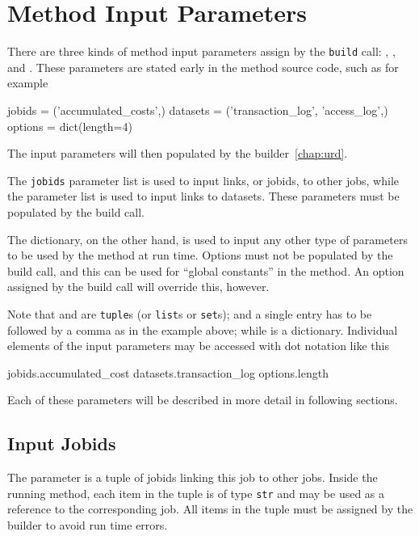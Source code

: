 \section{Method Input Parameters}
\label{sec:input_params}

There are three kinds of method input parameters assign by
the \texttt{build} call: \jobids, \datasets, and \options.  These
parameters are stated early in the method source code, such as for
example
\begin{python}
jobids = ('accumulated_costs',)
datasets = ('transaction_log', 'access_log',)
options = dict(length=4)
\end{python}
The input parameters will then populated by the
builder~\ref{chap:urd}.

The \texttt{jobids} parameter list is used to input links, or jobids,
to other jobs, while the \datasets parameter list is used to input
links to datasets.  These parameters must be populated by the build
call.

The \options dictionary, on the other hand, is used to input any other
type of parameters to be used by the method at run time.  Options must
not be populated by the build call, and this can be used for ``global
constants'' in the method.  An option assigned by the build call will
override this, however.

Note that \jobids and \datasets are \texttt{tuple}s (or \texttt{list}s
or \texttt{set}s); and a single entry has to be followed by a comma as
in the example above; while \options is a dictionary.  Individual
elements of the input parameters may be accessed with dot notation
like this
\begin{python}
jobids.accumulated_cost
datasets.transaction_log
options.length
\end{python}
Each of these parameters will be described in more detail in following
sections.




\subsection*{Input Jobids}
The \jobids parameter is a tuple of jobids linking this job to other
jobs.  Inside the running method, each item in the \jobids tuple is of
type \texttt{str} and may be used as a reference to the corresponding
job.  All items in the \jobids tuple must be assigned by the builder to
avoid run time errors.





